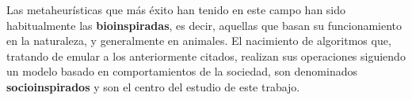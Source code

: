 Las metaheurísticas que más éxito han tenido en este campo han sido habitualmente las \textbf{bioinspiradas}, es decir, aquellas que basan su funcionamiento en la naturaleza, y generalmente en animales. El nacimiento de algoritmos que, tratando de emular a los anteriormente citados, realizan sus operaciones siguiendo un modelo basado en comportamientos de la sociedad, son denominados \textbf{socioinspirados} y son el centro del estudio de este trabajo.